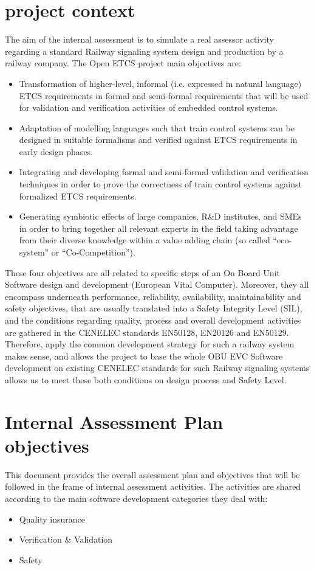 \documentclass{template/openetcs_report}
\begin{document}
\section{project context}
The aim of the internal assessment is to simulate a real assessor activity regarding a standard Railway signaling system design and production by a railway company. The Open ETCS project main objectives are:
\begin{itemize}
\item Transformation of higher-level, informal (i.e. expressed in natural language) ETCS requirements in formal and semi-formal requirements that will be used for validation and verification activities of embedded control systems.
\item Adaptation of modelling languages such that train control systems can be designed in suitable formalisms and verified against ETCS requirements in early design phases.
\item Integrating and developing formal and semi-formal validation and verification techniques in order to prove the correctness of train control systems against formalized ETCS requirements.
\item Generating symbiotic effects of large companies, R\&D institutes, and SMEs in order to bring together all relevant experts in the field taking advantage from their diverse knowledge within a value adding chain (so called “eco-system” or “Co-Competition”).
\end{itemize}

These four objectives are all related to specific steps of an On Board Unit Software design and development (European Vital Computer). Moreover, they all encompass underneath performance, reliability, availability, maintainability and safety objectives, that are usually translated into a Safety Integrity Level (SIL), and the conditions regarding quality, process and overall development activities are gathered in the CENELEC standards EN50128, EN20126 and EN50129.
Therefore, apply the common development strategy for such a railway system makes sense, and allows the project to base the whole OBU EVC Software development on existing CENELEC standards for such Railway signaling systems allows us to meet these both conditions on design process and Safety Level.

\section{Internal Assessment Plan objectives}
This document provides the overall assessment plan and objectives that will be followed in the frame of internal assessment activities.
The activities are shared according to the main software development categories they deal with:
\begin{itemize}
\item Quality insurance
\item Verification \& Validation
\item Safety
\end{itemize}
\end{document}
